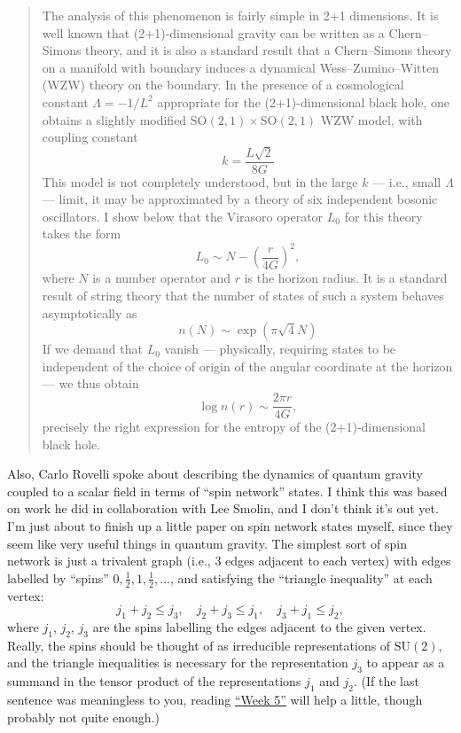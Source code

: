 \documentclass{article}
\begin{document}
\begin{quote}
The analysis of this phenomenon is fairly simple in 2+1 dimensions. It
is well known that (2+1)-dimensional gravity can be written as a
Chern--Simons theory, and it is also a standard result that a
Chern--Simons theory on a manifold with boundary induces a dynamical
Wess--Zumino--Witten (WZW) theory on the boundary. In the presence of a
cosmological constant \(\Lambda = -1/L^2\) appropriate for the
(2+1)-dimensional black hole, one obtains a slightly modified
\(\mathrm{SO}(2,1) \times \mathrm{SO}(2,1)\) WZW model, with coupling
constant \[k = \frac{L\sqrt{2}}{8G}\] This model is not completely
understood, but in the large \(k\) --- i.e., small \(\Lambda\) ---
limit, it may be approximated by a theory of six independent bosonic
oscillators. I show below that the Virasoro operator \(L_0\) for this
theory takes the form \[L_0 \sim N -\left(\frac{r}{4G}\right)^2,\] where
\(N\) is a number operator and \(r\) is the horizon radius. It is a
standard result of string theory that the number of states of such a
system behaves asymptotically as \[n(N) \sim \exp(\pi \sqrt{4} N)\] If
we demand that \(L_0\) vanish --- physically, requiring states to be
independent of the choice of origin of the angular coordinate at the
horizon --- we thus obtain \[\log n(r) \sim \frac{2 \pi r}{4G},\]
precisely the right expression for the entropy of the (2+1)-dimensional
black hole.
\end{quote}

Also, Carlo Rovelli spoke about describing the dynamics of quantum
gravity coupled to a scalar field in terms of ``spin network'' states. I
think this was based on work he did in collaboration with Lee Smolin,
and I don't think it's out yet. I'm just about to finish up a little
paper on spin network states myself, since they seem like very useful
things in quantum gravity. The simplest sort of spin network is just a
trivalent graph (i.e., 3 edges adjacent to each vertex) with edges
labelled by ``spins'' \(0,\frac{1}{2},1,\frac{1}{2},\ldots\), and satisfying the
``triangle inequality'' at each vertex:
\[j_1 + j_2 \leqslant j_3, \quad j_2 + j_3 \leqslant j_1, \quad j_3 + j_1 \leqslant j_2,\]
where \(j_1\), \(j_2\), \(j_3\) are the spins labelling the edges
adjacent to the given vertex. Really, the spins should be thought of as
irreducible representations of \(\mathrm{SU}(2)\), and the triangle
inequalities is necessary for the representation \(j_3\) to appear as a
summand in the tensor product of the representations \(j_1\) and
\(j_2\). (If the last sentence was meaningless to you, reading
\protect\hyperlink{week5}{``Week 5''} will help a little, though
probably not quite enough.)
\end{document}
